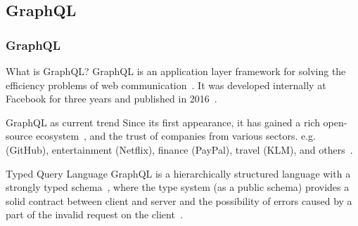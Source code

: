 \subsection{GraphQL}

\begin{frame}\frametitle{GraphQL}

  \footnotesize
  \begin{block}{What is GraphQL?}
  GraphQL is an application layer framework for solving the efficiency problems of web communication~\cite{gql-iot}. It was developed internally at  Facebook for three years and published in 2016~\cite{initial-analysis-of-gql}. 
  \end{block}

  \begin{block}{GraphQL as current trend}
  Since its first appearance, it has gained a rich open-source ecosystem~\cite{gql-healthcare}, and the trust of companies from various sectors. e.g. (GitHub), entertainment (Netflix), finance (PayPal), travel (KLM), and others~\cite{morph-gql-1}.
  \end{block}

\begin{block}{Typed Query Language}
  GraphQL is a hierarchically structured language with a strongly typed schema~\cite{gql-healthcare}, where the type system (as a public schema) provides a solid contract between client and server and the possibility of errors caused by a part of the invalid request on the client~\cite{real-time-sys-arc-based-on-gql}.
\end{block}

\end{frame}

